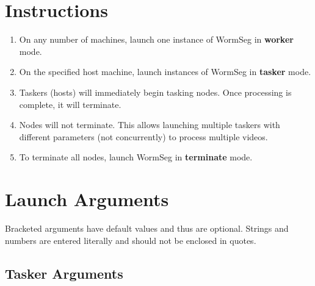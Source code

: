 \documentclass[]{article}
\begin{document}
\section{Instructions}
\begin{enumerate}
	\item On any number of machines, launch one instance of WormSeg in \textbf{worker} mode.
	\item On the specified host machine, launch instances of WormSeg in \textbf{tasker} mode.
	\item Taskers (hosts) will immediately begin tasking nodes. Once processing is complete, it will terminate.
	\item Nodes will not terminate. This allows launching multiple taskers with different parameters (not concurrently) to process multiple videos.
	\item To terminate all nodes, launch WormSeg in \textbf{terminate} mode.
\end{enumerate}

\section{Launch Arguments}
Bracketed arguments have default values and thus are optional. Strings and numbers are entered literally and should not be enclosed in quotes.
\subsection{Tasker Arguments}
\end{document}
